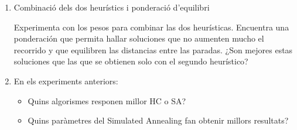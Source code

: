 \begin{enumerate}
\item Combinació dels dos heurístics i ponderació d'equilibri

Experimenta con los pesos para combinar las dos heurísticas. Encuentra una ponderación que permita hallar soluciones que no aumenten mucho el recorrido y que equilibren las distancias entre las paradas. ¿Son mejores estas soluciones que las que se obtienen solo con el segundo heurístico?

\item En els experiments anteriors:
\begin{itemize}
\item Quins algorismes responen millor HC o SA?
\item Quins paràmetres del Simulated Annealing fan obtenir millors resultats?
	\end{itemize}
		\end{enumerate}